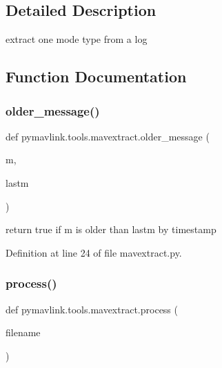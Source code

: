 \subsection{Detailed Description}
\begin{DoxyVerb}extract one mode type from a log
\end{DoxyVerb}
 

\subsection{Function Documentation}
\mbox{\label{namespacepymavlink_1_1tools_1_1mavextract_a0695c30418a7a66ccfdd36d36e194708}} 
\subsubsection{\texorpdfstring{older\_message()}{older\_message()}}
{\footnotesize\ttfamily def pymavlink.\+tools.\+mavextract.\+older\+\_\+message (\begin{DoxyParamCaption}\item[{}]{m,  }\item[{}]{lastm }\end{DoxyParamCaption})}

\begin{DoxyVerb}return true if m is older than lastm by timestamp\end{DoxyVerb}
 

Definition at line 24 of file mavextract.\+py.

\mbox{\label{namespacepymavlink_1_1tools_1_1mavextract_aa4c714213c51b033aae1046e5ce2e1ab}} 
\subsubsection{\texorpdfstring{process()}{process()}}
{\footnotesize\ttfamily def pymavlink.\+tools.\+mavextract.\+process (\begin{DoxyParamCaption}\item[{}]{filename }\end{DoxyParamCaption})}

